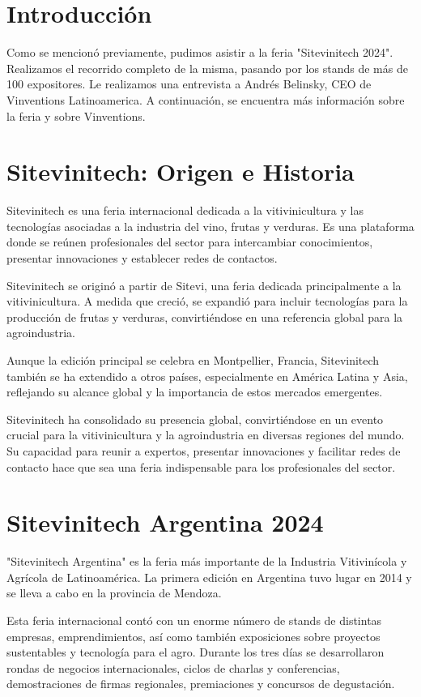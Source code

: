 \section{Introducción}

\noindent Como se mencionó previamente, pudimos asistir a la feria "Sitevinitech 2024". Realizamos el recorrido completo de la misma, pasando por los stands de más de 100 expositores. Le realizamos una entrevista a Andrés Belinsky, CEO de Vinventions Latinoamerica. A continuación, se encuentra más información sobre la feria y sobre Vinventions. 

\section{Sitevinitech: Origen e Historia}
Sitevinitech es una feria internacional dedicada a la vitivinicultura y las tecnologías asociadas a la industria del vino, frutas y verduras. Es una plataforma donde se reúnen profesionales del sector para intercambiar conocimientos, presentar innovaciones y establecer redes de contactos.

Sitevinitech se originó a partir de Sitevi, una feria dedicada principalmente a la vitivinicultura. A medida que creció, se expandió para incluir tecnologías para la producción de frutas y verduras, convirtiéndose en una referencia global para la agroindustria.

Aunque la edición principal se celebra en Montpellier, Francia, Sitevinitech también se ha extendido a otros países, especialmente en América Latina y Asia, reflejando su alcance global y la importancia de estos mercados emergentes.

Sitevinitech ha consolidado su presencia global, convirtiéndose en un evento crucial para la vitivinicultura y la agroindustria en diversas regiones del mundo. Su capacidad para reunir a expertos, presentar innovaciones y facilitar redes de contacto hace que sea una feria indispensable para los profesionales del sector.


\section{Sitevinitech Argentina 2024}

"Sitevinitech Argentina" es la feria más importante de la Industria Vitivinícola y Agrícola de Latinoamérica. La primera edición en Argentina tuvo lugar en 2014 y se lleva a cabo en la provincia de Mendoza.

Esta feria internacional contó con un enorme número de stands de distintas empresas, emprendimientos, así como también exposiciones sobre proyectos sustentables y tecnología para el agro. Durante los tres días se desarrollaron rondas de negocios internacionales, ciclos de charlas y conferencias, demostraciones de firmas regionales,  premiaciones y concursos de degustación. 

